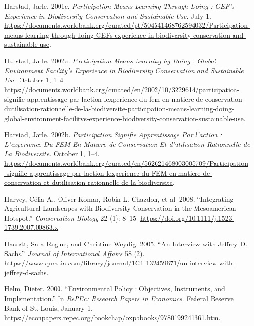 \begin{CSLReferences}{1}{1}
Harstad, Jarle. 2001c. \emph{Participation Means Learning Through Doing
: GEF's Experience in Biodiversity Conservation and Sustainable Use}.
July 1.
\url{https://documents.worldbank.org/curated/pt/504541468762594032/Participation-means-learning-through-doing-GEFs-experience-in-biodiversity-conservation-and-sustainable-use}.

Harstad, Jarle. 2002a. \emph{Participation Means Learning by Doing :
Global Environment Facility's Experience in Biodiversity Conservation
and Sustainable Use}. October 1, 1--4.
\url{https://documents.worldbank.org/curated/en/2002/10/3229614/participation-signifie-apprentissage-par-laction-lexperience-du-fem-en-matiere-de-conservation-dutilisation-rationnelle-de-la-biodiversite-participation-means-learning-doing-global-environment-facilitys-experience-biodiversity-conservation-sustainable-use}.

Harstad, Jarle. 2002b. \emph{Participation Signifie Apprentissage Par
l'action : L'experience Du FEM En Matiere de Conservation Et
d'utilisation Rationnelle de La Biodiversite}. October 1, 1--4.
\url{https://documents.worldbank.org/curated/en/562621468003005709/Participation-signifie-apprentissage-par-laction-lexperience-du-FEM-en-matiere-de-conservation-et-dutilisation-rationnelle-de-la-biodiversite}.

Harvey, Célia A., Oliver Komar, Robin L. Chazdon, et al. 2008.
{``Integrating Agricultural Landscapes with Biodiversity Conservation in
the Mesoamerican Hotspot.''} \emph{Conservation Biology} 22 (1): 8--15.
\url{https://doi.org/10.1111/j.1523-1739.2007.00863.x}.

Hassett, Sara Regine, and Christine Weydig. 2005. {``An Interview with
Jeffrey D. Sachs.''} \emph{Journal of International Affairs} 58 (2).
\url{https://www.questia.com/library/journal/1G1-132459671/an-interview-with-jeffrey-d-sachs}.

Helm, Dieter. 2000. {``Environmental Policy : Objectives, Instruments,
and Implementation.''} In \emph{RePEc: Research Papers in Economics}.
Federal Reserve Bank of St. Louis, January 1.
\url{https://econpapers.repec.org/bookchap/oxpobooks/9780199241361.htm}.


\end{CSLReferences}
